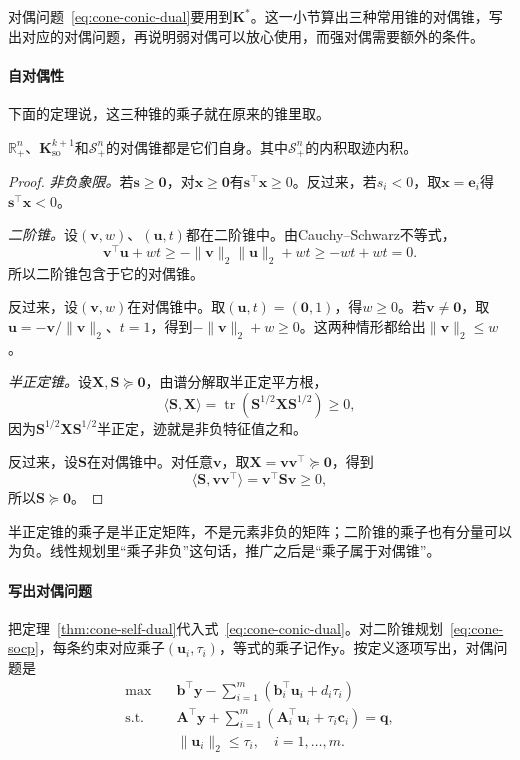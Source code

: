 对偶问题~\eqref{eq:cone-conic-dual}要用到$\bm{K}^*$。这一小节算出三种常用锥的对偶锥，写出对应的对偶问题，再说明弱对偶可以放心使用，而强对偶需要额外的条件。

\paragraph{自对偶性}
下面的定理说，这三种锥的乘子就在原来的锥里取。

\begin{theorem}[三种常用锥的自对偶性]
\label{thm:cone-self-dual}
$\mathbb{R}^n_+$、$\bm{K}_{\mathrm{so}}^{k+1}$和$\mathcal{S}^n_+$的对偶锥都是它们自身。其中$\mathcal{S}^n_+$的内积取迹内积。
\end{theorem}

\begin{proof}
\emph{非负象限。}若$\bm{s}\geq\bm{0}$，对$\bm{x}\geq\bm{0}$有$\bm{s}^\top\bm{x}\geq0$。反过来，若$s_i<0$，取$\bm{x}=\bm{e}_i$得$\bm{s}^\top\bm{x}<0$。

\emph{二阶锥。}设$(\bm{v},w)$、$(\bm{u},t)$都在二阶锥中。由Cauchy--Schwarz不等式，
\[
 \bm{v}^\top\bm{u}+wt\geq-\lVert\bm{v}\rVert_2\lVert\bm{u}\rVert_2+wt\geq-wt+wt=0.
\]
所以二阶锥包含于它的对偶锥。

反过来，设$(\bm{v},w)$在对偶锥中。取$(\bm{u},t)=(\bm{0},1)$，得$w\geq0$。若$\bm{v}\neq\bm{0}$，取$\bm{u}=-\bm{v}/\lVert\bm{v}\rVert_2$、$t=1$，得到$-\lVert\bm{v}\rVert_2+w\geq0$。这两种情形都给出$\lVert\bm{v}\rVert_2\leq w$。

\emph{半正定锥。}设$\bm{X},\bm{S}\succeq\bm{0}$，由谱分解取半正定平方根，
\[
 \langle\bm{S},\bm{X}\rangle=\operatorname{tr}(\bm{S}^{1/2}\bm{X}\bm{S}^{1/2})\geq0,
\]
因为$\bm{S}^{1/2}\bm{X}\bm{S}^{1/2}$半正定，迹就是非负特征值之和。

反过来，设$\bm{S}$在对偶锥中。对任意$\bm{v}$，取$\bm{X}=\bm{v}\bm{v}^\top\succeq\bm{0}$，得到
\[
 \langle\bm{S},\bm{v}\bm{v}^\top\rangle=\bm{v}^\top\bm{S}\bm{v}\geq0,
\]
所以$\bm{S}\succeq\bm{0}$。
\end{proof}

半正定锥的乘子是半正定矩阵，不是元素非负的矩阵；二阶锥的乘子也有分量可以为负。线性规划里“乘子非负”这句话，推广之后是“乘子属于对偶锥”。

\paragraph{写出对偶问题}
把定理~\ref{thm:cone-self-dual}代入式~\eqref{eq:cone-conic-dual}。对二阶锥规划~\eqref{eq:cone-socp}，每条约束对应乘子$(\bm{u}_i,\tau_i)$，等式的乘子记作$\bm{y}$。按定义逐项写出，对偶问题是
\begin{equation}
 \begin{aligned}
 \max\quad&\bm{b}^\top\bm{y}-\sum_{i=1}^m(\bm{b}_i^\top\bm{u}_i+d_i\tau_i)\\
 \text{s.t.}\quad&\bm{A}^\top\bm{y}+\sum_{i=1}^m(\bm{A}_i^\top\bm{u}_i+\tau_i\bm{c}_i)=\bm{q},\\
 &\lVert\bm{u}_i\rVert_2\leq\tau_i,\quad i=1,\ldots,m.
 \end{aligned}
 \label{eq:cone-socp-dual}
\end{equation}

